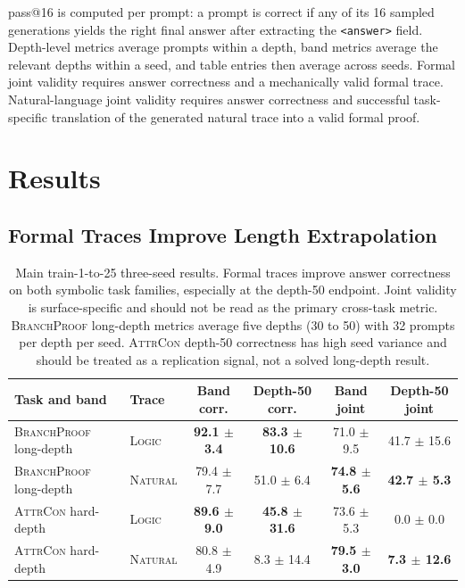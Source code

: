 \documentclass[11pt]{article}
\makeatletter
\newcommand{\branchproof}{\textsc{BranchProof}}
\newcommand{\attrcon}{\textsc{AttrCon}}
\newcommand{\logic}{\textsc{Logic}}
\newcommand{\nl}{\textsc{Natural}}
\newcommand{\passsixteen}{pass@16}
\makeatother
\begin{document}
\passsixteen{} is computed per prompt: a prompt is correct if any of its 16
sampled generations yields the right final answer after extracting the
\texttt{<answer>} field. Depth-level metrics average prompts within a depth,
band metrics average the relevant depths within a seed, and table entries then
average across seeds. Formal joint validity requires answer correctness and a
mechanically valid formal trace. Natural-language joint validity requires answer
correctness and successful task-specific translation of the generated natural
trace into a valid formal proof.

\section{Results}
\label{sec:results}

\subsection{Formal Traces Improve Length Extrapolation}

\begin{table}[t]
\centering
\small
\begin{tabular}{llcccc}
\toprule
Task and band & Trace & Band corr. & Depth-50 corr. & Band joint & Depth-50 joint \\
\midrule
\branchproof{} long-depth & \logic{} & \textbf{92.1 $\pm$ 3.4} & \textbf{83.3 $\pm$ 10.6} & 71.0 $\pm$ 9.5 & 41.7 $\pm$ 15.6 \\
\branchproof{} long-depth & \nl{} & 79.4 $\pm$ 7.7 & 51.0 $\pm$ 6.4 & \textbf{74.8 $\pm$ 5.6} & \textbf{42.7 $\pm$ 5.3} \\
\midrule
\attrcon{} hard-depth & \logic{} & \textbf{89.6 $\pm$ 9.0} & \textbf{45.8 $\pm$ 31.6} & 73.6 $\pm$ 5.3 & 0.0 $\pm$ 0.0 \\
\attrcon{} hard-depth & \nl{} & 80.8 $\pm$ 4.9 & 8.3 $\pm$ 14.4 & \textbf{79.5 $\pm$ 3.0} & \textbf{7.3 $\pm$ 12.6} \\
\bottomrule
\end{tabular}
\caption{Main train-1-to-25 three-seed results. Formal traces improve answer
correctness on both symbolic task families, especially at the depth-50 endpoint.
Joint validity is surface-specific and should not be read as the primary
cross-task metric. \branchproof{} long-depth metrics average five depths
(30 to 50) with 32 prompts per depth per seed. \attrcon{} depth-50 correctness has
high seed variance and should be treated as a replication signal, not a solved
long-depth result.}
\label{tab:main}
\end{table}
\end{document}
